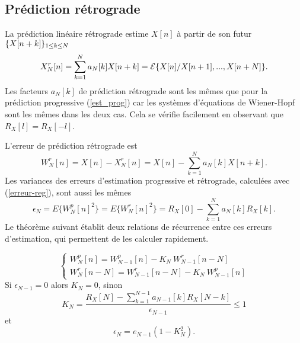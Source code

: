 \subsection{Pr\'ediction r\'etrograde}
\label{levions-pred}

La pr\'ediction lin\'eaire r\'etrograde estime $X[n]$
\`a partir de son futur $\{X[n+k]\}_{ 1 \leq k \leq N}$
\[
X^r_N [n] = \sum_{k=1}^N a_N[k] X[n+k] = {\cal E} \{ X[n] {/}
X[n+1], ..., X[n+N] \} .
\]
Les facteurs $a_N [k]$ de pr\'ediction r\'etrograde sont les
m\^emes que pour la
pr\'ediction progressive (\ref{est_prog}) car 
les syst\`emes d'\'equations de Wiener-Hopf sont les m\^emes 
dans les
deux cas.
Cela se v\'erifie facilement en observant que
$R_X[l] = R_X[-l]$.

L'erreur de pr\'ediction r\'etrograde est
\begin{equation}
\label{error-retro}
W_N^r [n] = X[n] - X^r_N [n] = X[n] - \sum_{k=1}^N a_N[k] X[n+k] .
\end{equation}
Les variances des erreurs d'estimation progressive et r\'etrograde, 
calcul\'ees avec (\ref{erreur-reg}), sont aussi les m\^emes
\[
\epsilon_N = E\{W_N^p [n]^2 \}  = 
E\{W_N^r [n]^2 \} = R_X[0]  - \sum_{k=1}^N a_N[k] R_X[k] .
\]
Le th\'eor\`eme suivant \'etablit deux relations de r\'ecurrence
entre ces erreurs d'estimation, qui permettent de les calculer
rapidement.

\begin{theorem}
\label{levinson}
\begin{equation}
\label{erreur-rec}
\left\{ \begin{array}{l}
W_N^p [n] = W_{N-1}^p [n] - 
K_N ~W^r_{N-1} [n-N] \\
W_N^r [n-N] = W_{N-1}^r [n-N] - 
K_N ~W^p_{N-1} [n] 
\end{array}
\right.
\end{equation}
Si $\epsilon_{N-1} = 0$ alors $K_N = 0$, sinon 
\begin{equation}
\label{reflection}
K_N = \frac {R_X [N] - \sum_{k=1}^{N-1} a_{N-1} [k] R_X[N-k]}
{\epsilon_{N-1}} \leq 1
\end{equation}
et
\begin{equation}
\label{energie-kn}
\epsilon_N = e _{N-1} (1 - K_N^ 2 )  .
\end{equation}
\end{theorem}

